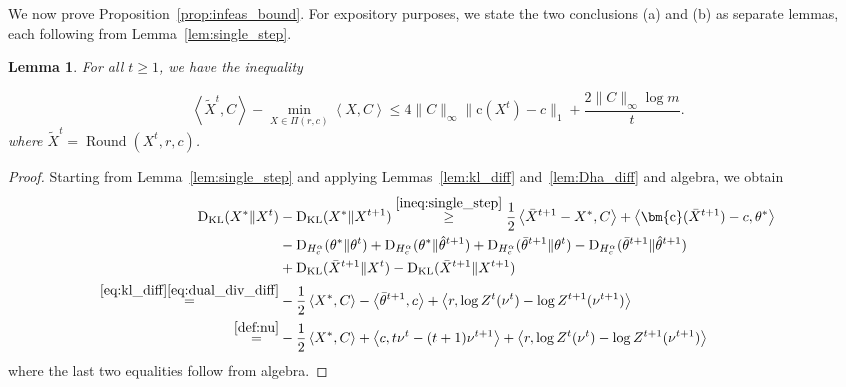 \documentclass[10pt]{article}
\newcommand{\DHa}{\D_{H_c^\alpha}}
\newcommand{\inner}[2]{\left\langle #1,#2\right\rangle}
\newcommand{\coup}{\Pi}
\newcommand{\D}{\operatorname{D}}
\theoremstyle{plain}
\newtheorem{lemma}[theorem]{Lemma}
\theoremstyle{definition}
\theoremstyle{remark}
\newcommand{\KL}{\mathrm{D}_\mathrm{KL}}
\newcommand{\col}{\bm{\mathrm{c}}}
\begin{document}
We now prove Proposition~\ref{prop:infeas_bound}. For expository purposes, we state the two conclusions (a) and (b) as separate lemmas, each following from Lemma~\ref{lem:single_step}.
\begin{lemma}\label{lem:last_iterate}
    For all $t\geq 1$, we have the inequality
    
    \begin{equation}
        \inner{\widetilde{X}^t}{C}-\min_{X\in\coup(r,c)}\inner{X}{C}\leq 4\|C\|_\infty\|\col(X^t)-c\|_1 + \frac{2\|C\|_\infty\log m}{t}.
    \end{equation}
    where $\widetilde{X}^t=\operatorname{Round}(X^t, r, c)$.
\end{lemma}
\begin{proof}        
        Starting from Lemma~\ref{lem:single_step} and applying Lemmas~\ref{lem:kl_diff} and~\ref{lem:Dha_diff} and algebra, we obtain
        \begin{align*}
        \KL(X^*\|X^t)&-\KL(X^*\|X^{t+1})\stackrel{\eqref{ineq:single_step}}\geq\frac{1}{2}\inner{\bar X^{t+1}-X^*}{C}+\inner{\col(\bar X^{t+1})-c}{\theta^*}\\
        &-\DHa(\theta^*\|\theta^{t})+\DHa(\theta^*\|\hat\theta^{t+1}) +\DHa(\bar\theta^{t+1}\|\theta^{t})-\DHa(\bar\theta^{t+1}\|\hat\theta^{t+1}) \\
        &+ \KL(\bar X^{t+1}\|X^t)-\KL(\bar X^{t+1}\|X^{t+1})\\
        \stackrel{\eqref{eq:kl_diff}\eqref{eq:dual_div_diff}}=&-\frac{1}{2}\inner{X^*}{C}-\inner{\bar\theta^{t+1}}{c} + \inner{r}{\log Z^{t}(\nu^{t}) - \log Z^{t+1}(\nu^{t+1})}\\
        \stackrel{\eqref{def:nu}}=&-\frac{1}{2}\inner{X^*}{C}+\inner{c}{t\nu^t-(t+1)\nu^{t+1}} + \inner{r}{\log Z^{t}(\nu^{t}) - \log Z^{t+1}(\nu^{t+1})}
    \end{align*}
    where the last two equalities follow from algebra.


\end{proof}
\end{document}
